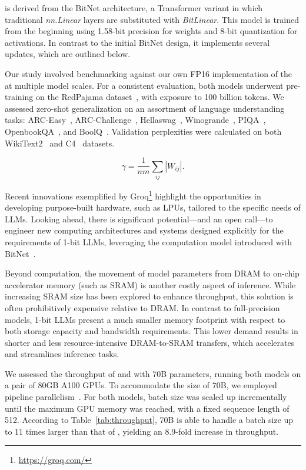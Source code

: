  is derived from the BitNet architecture, a Transformer variant in which traditional \emph{nn.Linear} layers are substituted with \emph{BitLinear}. This model is trained from the beginning using 1.58-bit precision for weights and 8-bit quantization for activations. In contrast to the initial BitNet design, it implements several updates, which are outlined below.

Our study involved benchmarking  against our own FP16 implementation of the  at multiple model scales. For a consistent evaluation, both models underwent pre-training on the RedPajama dataset~\cite{redpajama}, with exposure to 100 billion tokens. We assessed zero-shot generalization on an assortment of language understanding tasks: ARC-Easy~\cite{arc}, ARC-Challenge~\cite{arc}, Hellaswag~\cite{hellaswag}, Winogrande~\cite{winoGrande}, PIQA~\cite{piqa}, OpenbookQA~\cite{openbookqa}, and BoolQ~\cite{boolq}. Validation perplexities were calculated on both WikiText2~\cite{wikitext2} and C4~\cite{c4} datasets.

\begin{equation}
    \gamma = \frac{1}{nm}\sum_{ij} |W_{ij}|.
\end{equation}

Recent innovations exemplified by Groq\footnote{\url{https://groq.com/}} highlight the opportunities in developing purpose-built hardware, such as LPUs, tailored to the specific needs of LLMs. Looking ahead, there is significant potential—and an open call—to engineer new computing architectures and systems designed explicitly for the requirements of 1-bit LLMs, leveraging the computation model introduced with BitNet~\cite{bitnet}.

Beyond computation, the movement of model parameters from DRAM to on-chip accelerator memory (such as SRAM) is another costly aspect of inference. While increasing SRAM size has been explored to enhance throughput, this solution is often prohibitively expensive relative to DRAM. In contrast to full-precision models, 1-bit LLMs present a much smaller memory footprint with respect to both storage capacity and bandwidth requirements. This lower demand results in shorter and less resource-intensive DRAM-to-SRAM transfers, which accelerates and streamlines inference tasks.

We assessed the throughput of  and  with 70B parameters, running both models on a pair of 80GB A100 GPUs. To accommodate the size of  70B, we employed pipeline parallelism~\cite{gpipe}. For both models, batch size was scaled up incrementally until the maximum GPU memory was reached, with a fixed sequence length of 512. According to Table~\ref{tab:throughput},  70B is able to handle a batch size up to 11 times larger than that of , yielding an 8.9-fold increase in throughput.


